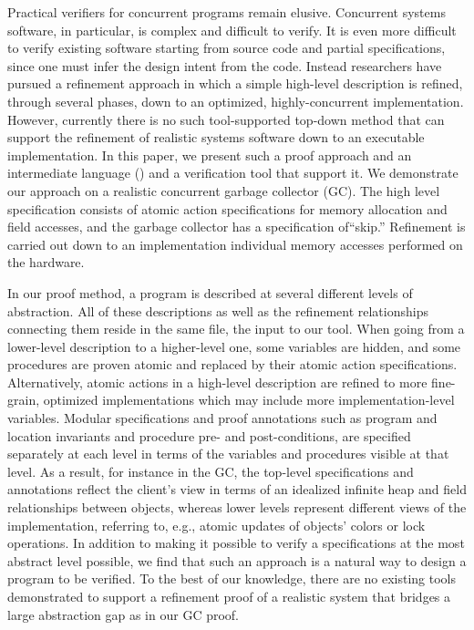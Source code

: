 Practical verifiers for concurrent programs remain elusive.  Concurrent systems software, in particular, is complex and difficult to verify. It is even more difficult to verify existing software starting from source code and partial specifications, since one must infer the design intent from the code.  Instead researchers have pursued a refinement approach in which a simple high-level description is refined, through several phases, down to an optimized, highly-concurrent implementation.  However, currently there is no such tool-supported top-down method that can support the refinement of realistic systems software down to an executable implementation.  In this paper, we present such a proof approach and an intermediate language (\civl) and a verification tool that support it.  We demonstrate our approach on a realistic concurrent garbage collector (GC). The high level specification consists of atomic action specifications for memory allocation and field accesses, and the garbage collector has a specification of``skip.'' Refinement is carried out down to an implementation individual memory accesses performed on the hardware.

In our proof method, a program is described at several different levels of abstraction. 
All of these descriptions as well as the refinement relationships connecting them reside in the same \civl file, the input to our tool. 
When going from a lower-level description to a higher-level one, some variables are hidden, and some procedures are proven atomic and replaced by their atomic action specifications. 
Alternatively, atomic actions in a high-level description are refined to more fine-grain, optimized implementations which may include more implementation-level variables. 
Modular specifications and proof annotations such as program and location invariants and procedure pre- and post-conditions, are specified separately at each level in terms of the variables and procedures visible at that level. 
As a result, for instance in the GC, the top-level specifications and annotations reflect the client's view in terms of an idealized infinite heap and field relationships between objects, 
 whereas lower levels represent different views of the implementation, referring to, e.g., atomic updates of objects' colors or lock operations.
In addition to making it possible to verify a specifications at the most abstract level possible, we find that such an approach is a natural way to design a program to be verified. 
To the best of our knowledge, there are no existing tools demonstrated to support a refinement proof of a realistic system that bridges a large abstraction gap as in our GC proof. 

